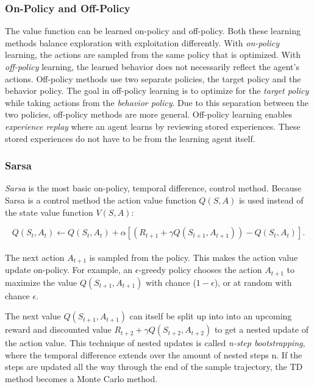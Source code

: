 \subsubsection*{On-Policy and Off-Policy}
The value function can be learned on-policy and off-policy. Both these learning methods balance exploration with exploitation differently. With \textit{on-policy} learning, the actions are sampled from the same policy that is optimized. With \textit{off-policy} learning, the learned behavior does not necessarily reflect the agent's actions. Off-policy methods use two separate policies, the target policy and the behavior policy. The goal in off-policy learning is to optimize for the \textit{target policy} while taking actions from the \textit{behavior policy}. Due to this separation between the two policies, off-policy methods are more general. Off-policy learning enables \textit{experience replay} where an agent learns by reviewing stored experiences. These stored experiences do not have to be from the learning agent itself.




\subsubsection*{Sarsa}
\textit{Sarsa} is the most basic on-policy, temporal difference, control method. Because Sarsa is a control method the action value function $Q(S,A)$ is used instead of the state value function $V(S,A)$: 

\begin{equation}     \label{eq: SARSA update}
    Q(S_t, A_t) \leftarrow Q(S_t, A_t) + \alpha [(R_{t+1} + \gamma Q(S_{t+1}, A_{t+1}))  - Q(S_t, A_t) ].
\end{equation}
\\[-2mm] \noindent
The next action $A_{t+1}$ is sampled from the policy. This makes the action value update  on-policy. For example, an $\epsilon$-greedy policy chooses the action $A_{t+1}$ to maximize the value $Q(S_{t+1}, A_{t+1})$ with chance ($ 1-\epsilon$), or at random with chance $\epsilon$.

The next value $Q(S_{t+1}, A_{t+1})$ can itself be split up into into an upcoming reward and discounted value $R_{t+2} + \gamma Q(S_{t+2}, A_{t+2})$ to get a nested update of the action value. This technique of nested updates is called \textit{n-step bootstrapping}, where the temporal difference extends over the amount of nested steps n. If the steps are updated all the way through the end of the sample trajectory, the TD method becomes a Monte Carlo method.  











